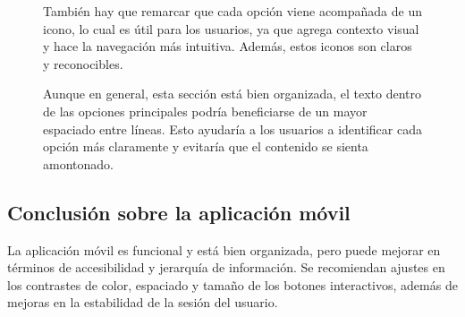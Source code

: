 \documentclass[a4paper,12pt]{article}
\begin{document}
\begin{figure}[htbp]
\begin{minipage}{0.3\textwidth}
        \setlength{\parskip}{20pt}  %
        
        También hay que remarcar que cada opción viene acompañada de un icono, lo cual es útil para los usuarios, ya que agrega contexto visual y hace la navegación más intuitiva. Además, estos iconos son claros y reconocibles.

        Aunque en general, esta sección está bien organizada, el texto dentro de las opciones principales podría beneficiarse de un mayor espaciado entre líneas. Esto ayudaría a los usuarios a identificar cada opción más claramente y evitaría que el contenido se sienta amontonado.
    \end{minipage}
\end{figure}

\subsection{Conclusión sobre la aplicación móvil}
La aplicación móvil es funcional y está bien organizada, pero puede mejorar en términos de accesibilidad y jerarquía de información. Se recomiendan ajustes en los contrastes de color, espaciado y tamaño de los botones interactivos, además de mejoras en la estabilidad de la sesión del usuario.
\end{document}

